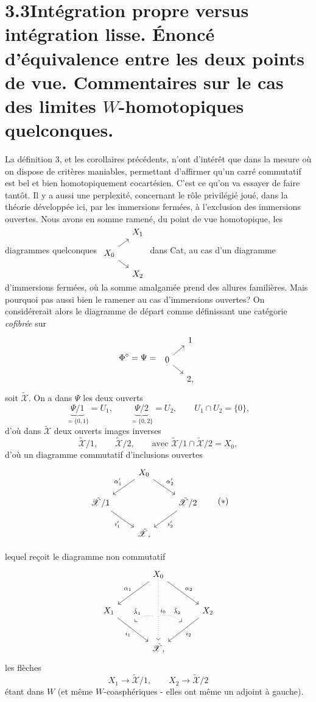 \documentclass[11pt]{article}
\newcommand{\printedpage}[1]{\marginpar{\footnotesize p.~#1}}
\newcommand{\msp}[1]{\marginpar{\footnotesize [#1]}}
\newcommand{\tX}{\tilde{\mathscr{X}}}
\begin{document}
\section*{3.3\quad Intégration propre versus intégration lisse. Énoncé d'équivalence entre les deux points de vue. Commentaires sur le cas des limites $W$-homotopiques quelconques.}

La définition 3, et les corollaires précédents, n'ont d'intérêt que dans la mesure où on dispose de critères maniables, permettant d'affirmer qu'un carré commutatif est bel et bien homotopiquement cocartésien. C'est ce qu'on va essayer de faire tantôt. Il y a aussi une perplexité, concernant le rôle privilégié joué, dans la théorie développée ici, par les immersions fermées, à l'exclusion des immersions ouvertes. Nous avons en somme ramené, du
\printedpage{91}
\msp{page 134}
point de vue homotopique, les diagrammes quelconques $\begin{tikzcd}[row sep=small, column sep=small]
 & X_1 \\
X_0 \arrow[ur] \arrow[dr] & \\
 & X_2
\end{tikzcd}$ dans Cat, au cas d'un diagramme d'immersions fermées, où la somme amalgamée prend des allures familières. Mais pourquoi pas aussi bien le ramener au cas d'immersions ouvertes? On considérerait alors le diagramme de départ comme définissant une catégorie \textit{cofibrée} sur
\[
\Phi^{\circ} = \Psi = \
\begin{tikzcd}[row sep=small, column sep=small]
 & 1 \\
0 \arrow[ur] \arrow[dr] & \\
 & 2,
\end{tikzcd}
\]
soit $\tX$. On a dans $\Psi$ les deux ouverts
\[
\underbrace{\Psi/1}_{=\{0,1\}} = U_1, \qquad \underbrace{\Psi/2}_{=\{0,2\}} = U_2, \qquad U_1 \cap U_2 = \{0\},
\]
d'où dans $\tX$ deux ouverts images inverses
\[
\tX/1, \qquad \tX/2, \qquad \text{avec } \tX/1 \cap \tX/2 = X_0,
\]
d'où un diagramme commutatif d'inclusions ouvertes
\[
\begin{tikzcd}
 & X_0 \arrow[dl, "\alpha'_1"'] \arrow[dr, "\alpha'_2"] & \\
\tX/1 \arrow[dr, "i'_1"'] & & \tX/2 \arrow[dl, "i'_2"] \\
 & \tX, &
\end{tikzcd}
\tag*{$(*)$}
\]

\msp{page 135}
lequel reçoit le diagramme non commutatif
\[
\begin{tikzcd}[row sep=large, column sep=large]
 & X_0 \arrow[dl, "\alpha_1"'] \arrow[dr, "\alpha_2"] \arrow[dd, dotted, "i_0", ""'{name=J0, pos=0.6}] & \\
X_1 \arrow[dr, "i_1"', ""{name=J1, pos=0.4}] & & X_2 \arrow[dl, "i_2", ""'{name=J2, pos=0.4}] \\
 & \tX, &
\arrow[from=J0, to=J1, dotted, bend right, "\tilde{\lambda}_1"', shorten <=2pt, shorten >=2pt]
\arrow[from=J0, to=J2, dotted, bend left, "\tilde{\lambda}_2", shorten <=2pt, shorten >=2pt]
\end{tikzcd}
\]
\printedpage{92}
les flèches
\[
X_1 \longrightarrow \tX/1, \qquad X_2 \longrightarrow \tX/2
\]
étant dans $W$ (et même $W$-coasphériques - elles ont même un adjoint à gauche).
\end{document}
